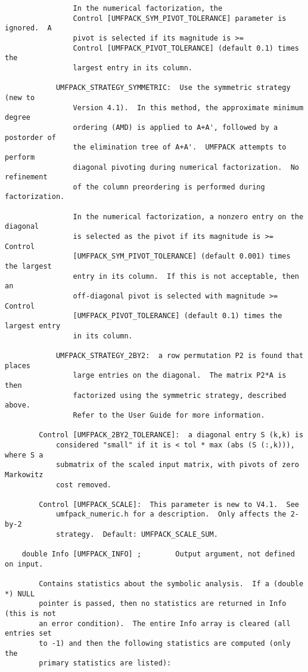 \documentclass[11pt]{article}
\begin{document}
{\begin{verbatim}
                In the numerical factorization, the
                Control [UMFPACK_SYM_PIVOT_TOLERANCE] parameter is ignored.  A
                pivot is selected if its magnitude is >=
                Control [UMFPACK_PIVOT_TOLERANCE] (default 0.1) times the
                largest entry in its column.

            UMFPACK_STRATEGY_SYMMETRIC:  Use the symmetric strategy (new to
                Version 4.1).  In this method, the approximate minimum degree
                ordering (AMD) is applied to A+A', followed by a postorder of
                the elimination tree of A+A'.  UMFPACK attempts to perform
                diagonal pivoting during numerical factorization.  No refinement
                of the column preordering is performed during factorization.

                In the numerical factorization, a nonzero entry on the diagonal
                is selected as the pivot if its magnitude is >= Control
                [UMFPACK_SYM_PIVOT_TOLERANCE] (default 0.001) times the largest
                entry in its column.  If this is not acceptable, then an
                off-diagonal pivot is selected with magnitude >= Control
                [UMFPACK_PIVOT_TOLERANCE] (default 0.1) times the largest entry
                in its column.

            UMFPACK_STRATEGY_2BY2:  a row permutation P2 is found that places
                large entries on the diagonal.  The matrix P2*A is then
                factorized using the symmetric strategy, described above.
                Refer to the User Guide for more information.

        Control [UMFPACK_2BY2_TOLERANCE]:  a diagonal entry S (k,k) is
            considered "small" if it is < tol * max (abs (S (:,k))), where S a
            submatrix of the scaled input matrix, with pivots of zero Markowitz
            cost removed.

        Control [UMFPACK_SCALE]:  This parameter is new to V4.1.  See
            umfpack_numeric.h for a description.  Only affects the 2-by-2
            strategy.  Default: UMFPACK_SCALE_SUM.

    double Info [UMFPACK_INFO] ;        Output argument, not defined on input.

        Contains statistics about the symbolic analysis.  If a (double *) NULL
        pointer is passed, then no statistics are returned in Info (this is not
        an error condition).  The entire Info array is cleared (all entries set
        to -1) and then the following statistics are computed (only the
        primary statistics are listed):


\end{verbatim}}
\end{document}
